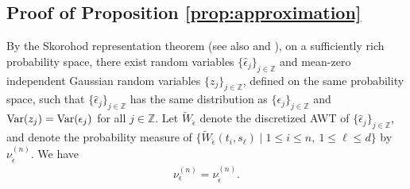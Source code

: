 \documentclass{amsart}
\begin{document}
\subsection{Proof of Proposition \ref{prop:approximation}}\label{sec:proof:prop:approximation}
By the Skorohod representation theorem \cite{wu2007strong}
(see also \cite[Theorem 3.1]{mies2023sequential} and \cite[Theorem 3.1]{wu2025uncertainty}),
on a sufficiently rich probability space, there exist random variables $\{\widehat{\epsilon}_{j}\}_{j\in \mathbb{Z}}$ and mean-zero independent Gaussian random
variables $\{z_{j}\}_{j\in \mathbb{Z}}$, defined on the same probability space,
such that $\{\widehat{\epsilon}_{j}\}_{j\in \mathbb{Z}}$ has the same distribution as $\{\epsilon_{j}\}_{j\in \mathbb{Z}}$ and $\textup{Var}(z_{j}) = \textup{Var}(\epsilon_{j})$ for all $j\in \mathbb{Z}$.
Let $\widetilde{W}_{\widehat{\epsilon}}$ denote the discretized AWT of $\{\widehat{\epsilon}_{j}\}_{j\in \mathbb{Z}}$,
and
denote the probability measure of
$\{\widetilde{W}_{\widehat{\epsilon}}(t_{i},s_{\ell})\mid 1\leq i\leq n,\ 1\leq \ell \leq d\}$
by $\nu_{\widehat{\epsilon}}^{(n)}$.
We have
\begin{align}\label{epsilon_D_proxy}
\nu_{\epsilon}^{(n)}=\nu_{\widehat{\epsilon}}^{(n)}.
\end{align}
\end{document}
